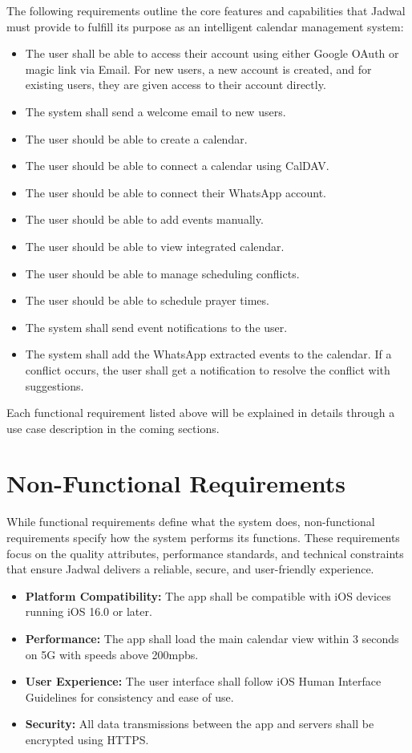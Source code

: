 \documentclass[12pt,a4paper,twoside]{report}
\begin{document}
The following requirements outline the core features and capabilities that Jadwal must provide to fulfill its purpose as an intelligent calendar management system:
\begin{itemize}
    \item The user shall be able to access their account using either Google OAuth or magic link via Email. For new users, a new account is created, and for existing users, they are given access to their account directly.
    \item The system shall send a welcome email to new users.
    \item The user should be able to create a calendar.
    \item The user should be able to connect a calendar using CalDAV.
    \item The user should be able to connect their WhatsApp account.
    \item The user should be able to add events manually.
    \item The user should be able to view integrated calendar.
    \item The user should be able to manage scheduling conflicts.
    \item The user should be able to schedule prayer times.
    \item The system shall send event notifications to the user.
    \item The system shall add the WhatsApp extracted events to the calendar. If a conflict occurs, the user shall get a notification to resolve the conflict with suggestions.
\end{itemize}

Each functional requirement listed above will be explained in details through a use case description in the coming sections.

\newpage

\section{Non-Functional Requirements}

While functional requirements define what the system does, non-functional requirements specify how the system performs its functions. These requirements focus on the quality attributes, performance standards, and technical constraints that ensure Jadwal delivers a reliable, secure, and user-friendly experience.

\begin{itemize}
    \item \textbf{Platform Compatibility:} The app shall be compatible with iOS devices running iOS 16.0 or later.
    \item \textbf{Performance:} The app shall load the main calendar view within 3 seconds on 5G with speeds above 200mpbs.
    \item \textbf{User Experience:} The user interface shall follow iOS Human Interface Guidelines for consistency and ease of use.
    \item \textbf{Security:} All data transmissions between the app and servers shall be encrypted using HTTPS.
\end{itemize}
\end{document}
